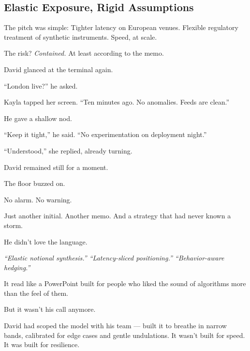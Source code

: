 \medskip



\subsection{Elastic Exposure, Rigid Assumptions}

The pitch was simple:
Tighter latency on European venues.
Flexible regulatory treatment of synthetic instruments.
Speed, at scale.

The risk?
\textit{Contained.} At least according to the memo.

David glanced at the terminal again.

“London live?” he asked.

Kayla tapped her screen. “Ten minutes ago. No anomalies. Feeds are clean.”

He gave a shallow nod.

“Keep it tight,” he said. “No experimentation on deployment night.”

“Understood,” she replied, already turning.

David remained still for a moment.

The floor buzzed on.

No alarm.
No warning.

Just another initial.
Another memo.
And a strategy that had never known a storm.


He didn’t love the language.

\textit{“Elastic notional synthesis.” “Latency-sliced positioning.” “Behavior-aware hedging.”}

It read like a PowerPoint built for people who liked the sound of algorithms more than the feel of them.

But it wasn’t his call anymore.

David had scoped the model with his team — built it to breathe in narrow bands, calibrated for edge 
cases and gentle undulations.
It wasn’t built for speed.
It was built for resilience.

\medskip

